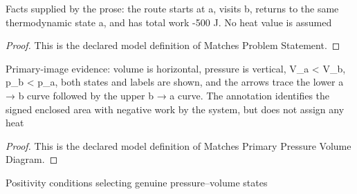 \begin{definition}
  \label{def:physics:phyx-mini-0470:phyxminiproblems-problemphyxmini0470-matchesproblemstatement}
  Facts supplied by the prose: the route starts at a, visits b, returns to the same thermodynamic state a, and has total work -500 J. No heat value is assumed
\end{definition}
\begin{proof}
  This is the declared model definition of Matches Problem Statement.
\end{proof}
\begin{definition}
  \label{def:physics:phyx-mini-0470:phyxminiproblems-problemphyxmini0470-matchesprimarypressurevolumediagram}
  Primary-image evidence: volume is horizontal, pressure is vertical, V\_a < V\_b, p\_b < p\_a, both states and labels are shown, and the arrows trace the lower a → b curve followed by the upper b → a curve. The annotation identifies the signed enclosed area with negative work by the system, but does not assign any heat
\end{definition}
\begin{proof}
  This is the declared model definition of Matches Primary Pressure Volume Diagram.
\end{proof}
\begin{definition}
  \label{def:physics:phyx-mini-0470:phyxminiproblems-problemphyxmini0470-hasphysicalstatereadouts}
  Positivity conditions selecting genuine pressure--volume states
\end{definition}
